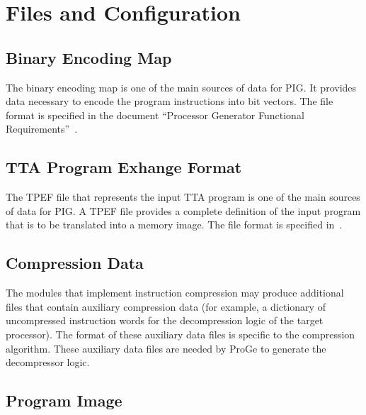 \documentclass[a4paper,twoside]{tce}
\begin{document}
\section{Files and Configuration}



%
%
%

\subsection{Binary Encoding Map}

The binary encoding map is one of the main sources of data for PIG. It
provides data necessary to encode the program instructions into bit
vectors. The file format is specified in the document ``Processor
Generator Functional Requirements''~\cite{ProGeSpecs}.

\subsection{TTA Program Exhange Format}

The TPEF file that represents the input TTA program is one of the main
sources of data for PIG. A TPEF file provides a complete definition of the
input program that is to be translated into a memory image. The file format
is specified in~\cite{TPEF-specs}.

\subsection{Compression Data}

The modules that implement instruction compression may produce additional
files that contain auxiliary compression data (for example, a dictionary of
uncompressed instruction words for the decompression logic of the target
processor). The format of these auxiliary data files is specific to the
compression algorithm. These auxiliary data files are needed by ProGe to
generate the decompressor logic.

\subsection{Program Image}
\end{document}
